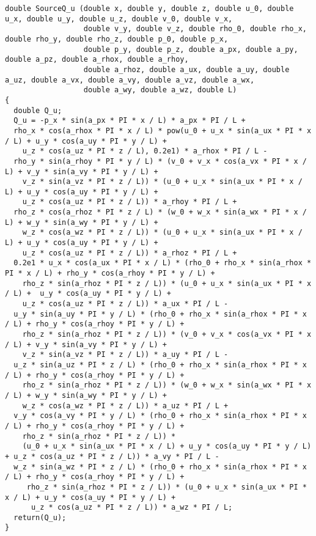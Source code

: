 \documentclass[10pt]{article}
\begin{document}
\begin{landscape}
\begin{verbatim}
double SourceQ_u (double x, double y, double z, double u_0, double u_x, double u_y, double u_z, double v_0, double v_x,
                  double v_y, double v_z, double rho_0, double rho_x, double rho_y, double rho_z, double p_0, double p_x,
                  double p_y, double p_z, double a_px, double a_py, double a_pz, double a_rhox, double a_rhoy,
                  double a_rhoz, double a_ux, double a_uy, double a_uz, double a_vx, double a_vy, double a_vz, double a_wx,
                  double a_wy, double a_wz, double L)
{
  double Q_u;
  Q_u = -p_x * sin(a_px * PI * x / L) * a_px * PI / L +
  rho_x * cos(a_rhox * PI * x / L) * pow(u_0 + u_x * sin(a_ux * PI * x / L) + u_y * cos(a_uy * PI * y / L) +
    u_z * cos(a_uz * PI * z / L), 0.2e1) * a_rhox * PI / L -
  rho_y * sin(a_rhoy * PI * y / L) * (v_0 + v_x * cos(a_vx * PI * x / L) + v_y * sin(a_vy * PI * y / L) +
    v_z * sin(a_vz * PI * z / L)) * (u_0 + u_x * sin(a_ux * PI * x / L) + u_y * cos(a_uy * PI * y / L) +
    u_z * cos(a_uz * PI * z / L)) * a_rhoy * PI / L +
  rho_z * cos(a_rhoz * PI * z / L) * (w_0 + w_x * sin(a_wx * PI * x / L) + w_y * sin(a_wy * PI * y / L) +
    w_z * cos(a_wz * PI * z / L)) * (u_0 + u_x * sin(a_ux * PI * x / L) + u_y * cos(a_uy * PI * y / L) +
    u_z * cos(a_uz * PI * z / L)) * a_rhoz * PI / L +
  0.2e1 * u_x * cos(a_ux * PI * x / L) * (rho_0 + rho_x * sin(a_rhox * PI * x / L) + rho_y * cos(a_rhoy * PI * y / L) +
    rho_z * sin(a_rhoz * PI * z / L)) * (u_0 + u_x * sin(a_ux * PI * x / L) +  u_y * cos(a_uy * PI * y / L) +
    u_z * cos(a_uz * PI * z / L)) * a_ux * PI / L -
  u_y * sin(a_uy * PI * y / L) * (rho_0 + rho_x * sin(a_rhox * PI * x / L) + rho_y * cos(a_rhoy * PI * y / L) +
    rho_z * sin(a_rhoz * PI * z / L)) * (v_0 + v_x * cos(a_vx * PI * x / L) + v_y * sin(a_vy * PI * y / L) +
    v_z * sin(a_vz * PI * z / L)) * a_uy * PI / L -
  u_z * sin(a_uz * PI * z / L) * (rho_0 + rho_x * sin(a_rhox * PI * x / L) + rho_y * cos(a_rhoy * PI * y / L) +
    rho_z * sin(a_rhoz * PI * z / L)) * (w_0 + w_x * sin(a_wx * PI * x / L) + w_y * sin(a_wy * PI * y / L) +
    w_z * cos(a_wz * PI * z / L)) * a_uz * PI / L +
  v_y * cos(a_vy * PI * y / L) * (rho_0 + rho_x * sin(a_rhox * PI * x / L) + rho_y * cos(a_rhoy * PI * y / L) +
    rho_z * sin(a_rhoz * PI * z / L)) *
    (u_0 + u_x * sin(a_ux * PI * x / L) + u_y * cos(a_uy * PI * y / L) + u_z * cos(a_uz * PI * z / L)) * a_vy * PI / L -
  w_z * sin(a_wz * PI * z / L) * (rho_0 + rho_x * sin(a_rhox * PI * x / L) + rho_y * cos(a_rhoy * PI * y / L) +
     rho_z * sin(a_rhoz * PI * z / L)) * (u_0 + u_x * sin(a_ux * PI * x / L) + u_y * cos(a_uy * PI * y / L) +
      u_z * cos(a_uz * PI * z / L)) * a_wz * PI / L;
  return(Q_u);
}
\end{verbatim}



\end{landscape}
\end{document}
